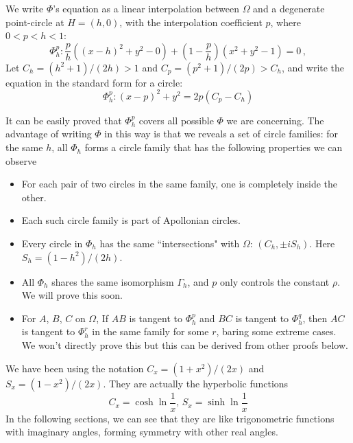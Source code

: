 \documentclass[]{article}
\begin{document}
We write $\Phi$'s equation as a linear interpolation between $\Omega$ and a degenerate point-circle at $H = (h, 0)$, with the interpolation coefficient $p$, where $0 < p < h < 1$:
\[
\Phi_{h}^{p}: \frac{p}{h}((x-h)^2 + y^2 - 0) + \left(1-\frac{p}{h}\right)(x^2+y^2-1) = 0\,,
\]
Let $C_h=(h^2+1)/(2h)>1$ and $C_p=(p^2+1)/(2p)>C_h$, and write the equation in the standard form for a circle:
\[
\Phi_{h}^{p}: (x-p)^2 + y^2 = 2p(C_p-C_h)
\]

It can be easily proved that $\Phi_{h}^{p}$ covers all possible $\Phi$ we are concerning. The advantage of writing $\Phi$ in this way is that we reveals a set of circle families: for the same $h$, all $\Phi_{h}$ forms a circle family that has the following properties we can observe
\begin{itemize}
	\item For each pair of two circles in the same family, one is completely inside the other.
	\item Each such circle family is part of Apollonian circles.
	\item Every circle in $\Phi_{h}$ has the same ``intersections" with $\Omega$: $(C_h, \pm i S_h)$. Here $S_h = (1-h^2)/(2h)$.
	\item All $\Phi_{h}$ shares the same isomorphism $\Gamma_h$, and $p$ only controls the constant $\rho$. We will prove this soon.
	\item For $A$, $B$, $C$ on $\Omega$, If $AB$ is tangent to $\Phi_{h}^{p}$ and $BC$ is tangent to $\Phi_{h}^{q}$, then $AC$ is tangent to $\Phi_{h}^{r}$ in the same family for some $r$, baring some extreme cases. We won't directly prove this but this can be derived from other proofs below.
\end{itemize}

We have been using the notation $C_x = (1+x^2)/(2x)$ and $S_x = (1-x^2)/(2x)$. They are actually the hyperbolic functions
\[
C_x = \cosh\ln \frac{1}{x}, \, S_x = \sinh\ln \frac{1}{x}
\] 
In the following sections, we can see that they are like trigonometric functions with imaginary angles, forming symmetry with other real angles.
\end{document}
